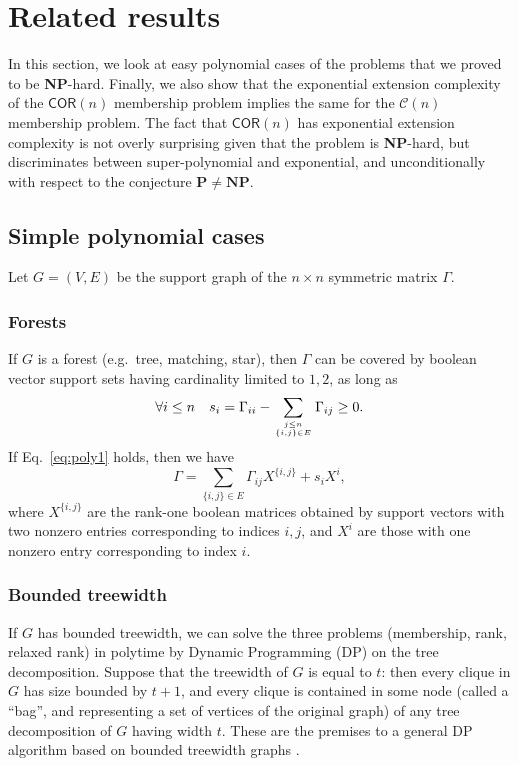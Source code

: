 \documentclass[envcountsect,envcountsame]{svjour3}
\theoremstyle{changebreak}                %
\newcommand{\COR}[1]{\mathsf{COR}(#1)}
\newcommand{\CONX}[1]{\mathcal{C}(#1)}
\begin{document}
\section{Related results}
\label{s:related}
In this section, we look at easy polynomial cases of the problems that we proved to be \textbf{NP}-hard. Finally, we also show that the exponential extension complexity of the $\COR{n}$ membership problem implies the same for the $\CONX{n}$ membership problem. The fact that $\COR{n}$ has exponential extension complexity is not overly surprising given that the problem is \textbf{NP}-hard, but \cite{kaibelWeltge} discriminates between super-polynomial and exponential, and unconditionally with respect to the conjecture $\mathbf{P}\not=\mathbf{NP}$.

\subsection{Simple polynomial cases}
\label{s:polycases}
Let $G=(V,E)$ be the support graph of the $n\times n$ symmetric matrix $\Gamma$.

\subsubsection{Forests}
If $G$ is a forest (e.g.~tree, matching, star), then $\Gamma$ can be covered by boolean vector support sets having cardinality limited to $1,2$, as long as
\begin{equation}
\forall i\le n\quad s_i=\Gamma_{ii} - \sum_{j\le n\atop \{i,j\}\in E}\Gamma_{ij}\ge 0. \label{eq:poly1}
\end{equation}
If Eq.~\eqref{eq:poly1} holds, then we have
\[\Gamma=\sum_{\{i,j\}\in E} \Gamma_{ij} X^{\{i,j\}} + s_i X^{i},\]
where $X^{\{i,j\}}$ are the rank-one boolean matrices obtained by support vectors with two nonzero entries corresponding to indices $i,j$, and $X^{i}$ are those with one nonzero entry corresponding to index $i$. 

\subsubsection{Bounded treewidth}
If $G$ has bounded treewidth, we can solve the three problems (membership, rank, relaxed rank) in polytime by Dynamic Programming (DP) on the tree decomposition. Suppose that the treewidth of $G$ is equal to $t$: then every clique in $G$ has size bounded by $t+1$, and every clique is contained in some node (called a ``bag'', and representing a set of vertices of the original graph) of any tree decomposition of $G$ having width $t$. These are the premises to a general DP algorithm based on bounded treewidth graphs \cite{bodlaender2}.
\end{document}
